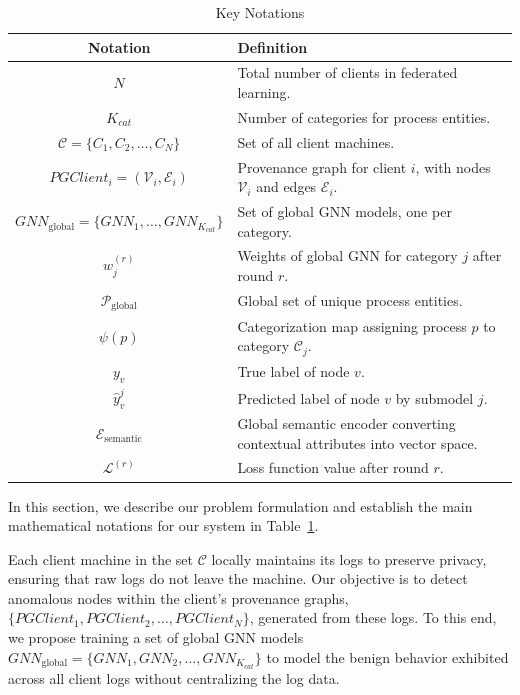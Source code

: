   \begin{table}[!t]
    \centering
    \scriptsize
    \caption{Key Notations}
    \label{tab:keynotations}
    \begin{tabular}{|c|p{4cm}|}
    \hline
    \textbf{Notation} & \textbf{Definition} \\ \hline
    \( N \) & Total number of clients in federated learning. \\ \hline
    \( K_{cat} \) & Number of categories for process entities. \\ \hline
    \( \mathcal{C} = \{C_1, C_2, \ldots, C_N\} \) & Set of all client machines. \\ \hline

    \( PGClient_{i} = (\mathcal{V}_i, \mathcal{E}_i) \) & Provenance graph for client \( i \), with nodes \( \mathcal{V}_i \) and edges \( \mathcal{E}_i \). \\ \hline
    \( {GNN}_{\text{global}} = \{GNN_1, \ldots, GNN_{K_{cat}}\} \) & Set of global GNN models, one per category. \\ \hline
    \( w_j^{(r)} \) & Weights of global GNN for category \( j \) after round \( r \). \\ \hline
    \( \mathcal{P}_{\text{global}} \) & Global set of unique process entities. \\ \hline
    \( \psi(p) \) & Categorization map assigning process \( p \) to category \( \mathcal{C}_j \). \\ \hline
    \( y_v \) & True label of node \( v \). \\ \hline
    \( \hat{y}_v^j \) & Predicted label of node \( v \) by submodel \( j \). \\ \hline
    \( \mathcal{E}_{\text{semantic}} \) & Global semantic encoder converting contextual attributes into vector space. \\ \hline
    \( \mathcal{L}^{(r)} \) & Loss function value after round \( r \). \\ \hline
    \end{tabular}
  \end{table}

In this section, we describe our problem formulation and establish the main mathematical notations for our system in Table~\ref{tab:keynotations}.

Each client machine in the set \( \mathcal{C} \) locally maintains its logs to preserve privacy, ensuring that raw logs do not leave the machine. Our objective is to detect anomalous nodes within the client's provenance graphs, \( \{PGClient_{1}, PGClient_{2}, \ldots, PGClient_{N}\} \), generated from these logs. To this end, we propose training a set of global GNN models \( {GNN}_{\text{global}} = \{GNN_1, GNN_2, \ldots, GNN_{K_{cat}}\}  \) to model the benign behavior exhibited across all client logs without centralizing the log data.

